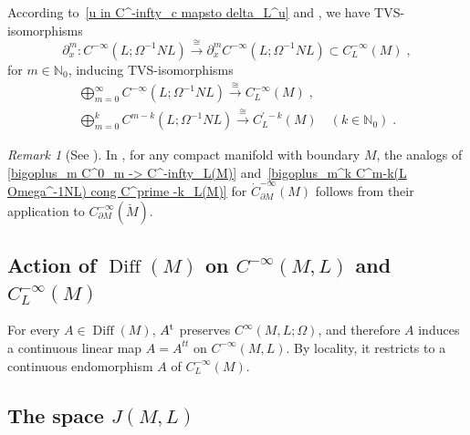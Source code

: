 \documentclass{memo-l}
\theoremstyle{plain}
\theoremstyle{definition}
\theoremstyle{remark}
\newtheorem{rem}[thm]{Remark}
\newcommand{\N}{\mathbb{N}}
\newcommand{\Diff}{\operatorname{Diff}}
\newcommand{\trans}{{\text{\rm t}}}
\numberwithin{section}{chapter}
\numberwithin{equation}{section}%
\begin{document}
According to~\eqref{u in C^-infty_c mapsto delta_L^u} and , we have TVS-isomorphisms 
\begin{equation}\label{C^-infty(L Omega^-1 NL) cong partial_x^m C^-infty(L Omega^-1 NL)}
\partial_x^m:C^{-\infty}(L;\Omega^{-1}NL)\xrightarrow{\cong}\partial_x^mC^{-\infty}(L;\Omega^{-1}NL)
\subset C^{-\infty}_L(M)\;,
\end{equation}
for $m\in\N_0$, inducing TVS-isomorphisms \cite[Proposition~7.7]{AlvKordyLeichtnam-conormal}
\begin{gather}
\bigoplus_{m=0}^\infty C^{-\infty}(L;\Omega^{-1}NL)\xrightarrow{\cong}C^{-\infty}_L(M)\;,
\label{bigoplus_m C^0_m -> C^-infty_L(M)}\\
\bigoplus_{m=0}^kC^{m-k}(L;\Omega^{-1}NL)\xrightarrow{\cong}C^{\prime\,-k}_L(M)\quad(k\in\N_0)\;.
\label{bigoplus_m^k C^m-k(L Omega^-1NL) cong C^prime -k_L(M)}
\end{gather}

\begin{rem}[{See \cite[Exercise~3.3.18]{Melrose1996}}]\label{r: description of dot C^infty_partial M(M)}
In , for any compact manifold with boundary $M$, the analogs of \eqref{bigoplus_m C^0_m -> C^-infty_L(M)} and~\eqref{bigoplus_m^k C^m-k(L Omega^-1NL) cong C^prime -k_L(M)} for $\dot C^{-\infty}_{\partial M}(M)$ follows from their application to $C^{-\infty}_{\partial M}(\breve M)$.
\end{rem}

\subsection{Action of $\Diff(M)$ on $C^{-\infty}(M,L)$ and $C^{-\infty}_L(M)$}
\label{ss: action of Diff(M) on C^-infty(M L) and C^-infty_L(M)}

For every $A\in\Diff(M)$, $A^\trans$ preserves $C^\infty(M,L;\Omega)$, and therefore $A$ induces a continuous linear map $A=A^{tt}$ on $C^{-\infty}(M,L)$. By locality, it restricts to a continuous endomorphism $A$ of $C^{-\infty}_L(M)$.


\subsection{The space $J(M,L)$}\label{ss: J(M L)}
\end{document}
